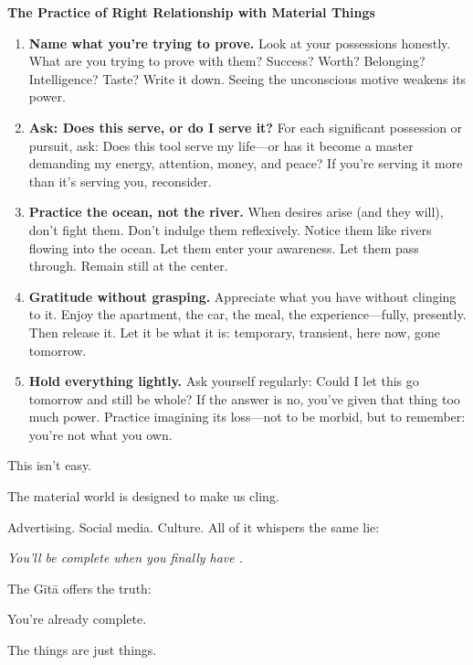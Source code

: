 \documentclass[11pt,twoside]{book}
\begin{document}
\begin{practicebox}
\textbf{The Practice of Right Relationship with Material Things}

\begin{enumerate}
\item \textbf{Name what you're trying to prove.} Look at your possessions honestly. What are you trying to prove with them? Success? Worth? Belonging? Intelligence? Taste? Write it down. Seeing the unconscious motive weakens its power.

\item \textbf{Ask: Does this serve, or do I serve it?} For each significant possession or pursuit, ask: Does this tool serve my life—or has it become a master demanding my energy, attention, money, and peace? If you're serving it more than it's serving you, reconsider.

\item \textbf{Practice the ocean, not the river.} When desires arise (and they will), don't fight them. Don't indulge them reflexively. Notice them like rivers flowing into the ocean. Let them enter your awareness. Let them pass through. Remain still at the center.

\item \textbf{Gratitude without grasping.} Appreciate what you have without clinging to it. Enjoy the apartment, the car, the meal, the experience—fully, presently. Then release it. Let it be what it is: temporary, transient, here now, gone tomorrow.

\item \textbf{Hold everything lightly.} Ask yourself regularly: Could I let this go tomorrow and still be whole? If the answer is no, you've given that thing too much power. Practice imagining its loss—not to be morbid, but to remember: you're not what you own.
\end{enumerate}
\end{practicebox}

This isn't easy.

The material world is designed to make us cling.

Advertising. Social media. Culture. All of it whispers the same lie:

\emph{You'll be complete when you finally have \underline{\hspace{2em}}.}

The Gītā offers the truth:

You're already complete.

The things are just things.
\end{document}
